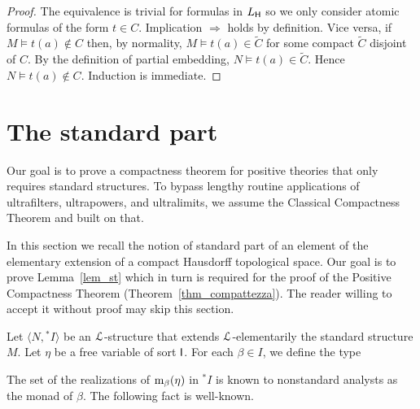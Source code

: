 \documentclass[10pt,oneside]{amsproc}
\renewcommand*{\emph}[1]{%
   \smash{\tikz[baseline]\node[rectangle, fill=teal!25, rounded corners, inner xsep=0.5ex, inner ysep=0.2ex, anchor=base, minimum height = 2.7ex]{\strut #1};}}
\begin{document}
\begin{proof}
  The equivalence is trivial for formulas in $L_{\sf H}$ so we only consider atomic formulas of the form $t\in C$.
  Implication $\Rightarrow$ holds by definition. 
  Vice versa, if $M\models t(a)\notin C$ then, by normality,  $M\models t(a)\in\tilde{C}$ for some compact $\tilde C$ disjoint of $C$.
  By the definition of partial embedding, $N\models t(a)\in\tilde{C}$.
  Hence $N\models t(a)\notin C$.
  Induction is immediate.
\end{proof}



\section{The standard part}\label{standard_part}

Our goal is to prove a compactness theorem for positive theories that only requires standard structures.
To bypass lengthy routine applications of ultrafilters, ultrapowers, and ultralimits, %
we assume the Classical Compactness Theorem and built on that.

In this section we recall the notion of standard part of an element of the elementary extension of a compact Hausdorff topological space.
Our goal is to prove Lemma~\ref{lem_st} which in turn is required for the proof of the Positive Compactness Theorem (Theorem~\ref{thm_compattezza}).
The reader willing to accept it without proof may skip this section.

Let $\langle N, {}^*\!\!I\rangle$ be an ${\EuScript L}$-structure that extends ${\EuScript L}$-elementarily the standard structure $M$. %
Let $\eta$ be a free variable of sort ${\sf I}$.
For each $\beta\in I$, we define the type


The set of the realizations of ${\rm m}_\beta(\eta)$ in ${}^*\!\!I$ is known to nonstandard analysts as the monad of $\beta$. 
The following fact is well-known.
\end{document}
